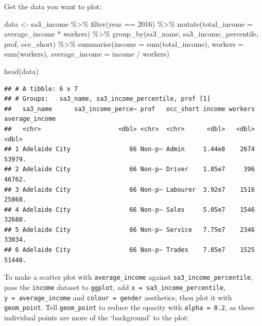 \documentclass[
]{book}
\newenvironment{Shaded}{\begin{snugshade}}{\end{snugshade}}
\newcommand{\AttributeTok}[1]{\textcolor[rgb]{0.77,0.63,0.00}{#1}}
\newcommand{\DecValTok}[1]{\textcolor[rgb]{0.00,0.00,0.81}{#1}}
\newcommand{\FunctionTok}[1]{\textcolor[rgb]{0.00,0.00,0.00}{#1}}
\newcommand{\NormalTok}[1]{#1}
\newcommand{\OtherTok}[1]{\textcolor[rgb]{0.56,0.35,0.01}{#1}}
\newcommand{\SpecialCharTok}[1]{\textcolor[rgb]{0.00,0.00,0.00}{#1}}
\begin{document}
Get the data you want to plot:

\begin{Shaded}
\begin{Highlighting}[]
\NormalTok{data }\OtherTok{\textless{}{-}}\NormalTok{ sa3\_income }\SpecialCharTok{\%\textgreater{}\%} 
  \FunctionTok{filter}\NormalTok{(year }\SpecialCharTok{==} \DecValTok{2016}\NormalTok{) }\SpecialCharTok{\%\textgreater{}\%}
  \FunctionTok{mutate}\NormalTok{(}\AttributeTok{total\_income =}\NormalTok{ average\_income }\SpecialCharTok{*}\NormalTok{ workers) }\SpecialCharTok{\%\textgreater{}\%} 
  \FunctionTok{group\_by}\NormalTok{(sa3\_name, sa3\_income\_percentile, prof, occ\_short) }\SpecialCharTok{\%\textgreater{}\%} 
  \FunctionTok{summarise}\NormalTok{(}\AttributeTok{income =} \FunctionTok{sum}\NormalTok{(total\_income),}
            \AttributeTok{workers =} \FunctionTok{sum}\NormalTok{(workers),}
            \AttributeTok{average\_income =}\NormalTok{ income }\SpecialCharTok{/}\NormalTok{ workers)}

\FunctionTok{head}\NormalTok{(data)}
\end{Highlighting}
\end{Shaded}

\begin{verbatim}
## # A tibble: 6 x 7
## # Groups:   sa3_name, sa3_income_percentile, prof [1]
##   sa3_name      sa3_income_perce~ prof   occ_short income workers average_income
##   <chr>                     <dbl> <chr>  <chr>      <dbl>   <dbl>          <dbl>
## 1 Adelaide City                66 Non-p~ Admin     1.44e8    2674         53979.
## 2 Adelaide City                66 Non-p~ Driver    1.85e7     396         46762.
## 3 Adelaide City                66 Non-p~ Labourer  3.92e7    1516         25868.
## 4 Adelaide City                66 Non-p~ Sales     5.05e7    1546         32680.
## 5 Adelaide City                66 Non-p~ Service   7.75e7    2346         33034.
## 6 Adelaide City                66 Non-p~ Trades    7.85e7    1525         51448.
\end{verbatim}

To make a scatter plot with \texttt{average\_income} against \texttt{sa3\_income\_percentile}, pass the \texttt{income} dataset to \texttt{ggplot}, add \texttt{x\ =\ sa3\_income\_percentile}, \texttt{y\ =\ average\_income} and \texttt{colour\ =\ gender} aesthetics, then plot it with \texttt{geom\_point}. Tell \texttt{geom\_point} to reduce the opacity with \texttt{alpha\ =\ 0.2}, as these individual points are more of the `background' to the plot:
\end{document}
